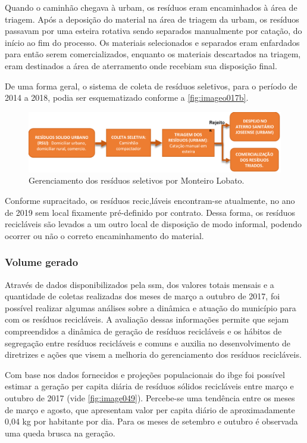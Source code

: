 	Quando o caminhão chegava à \gls{urbam}, os resíduos eram encaminhados à área de triagem. Após a deposição do material na área de triagem da \gls{urbam}, os resíduos passavam por uma esteira rotativa sendo separados manualmente por catação, do início ao fim do processo. Os materiais selecionados e separados eram enfardados para então serem comercializados, enquanto os materiais descartados na triagem, eram destinados a área de aterramento onde recebiam sua disposição final. 
	
	De uma forma geral, o sistema de coleta de resíduos seletivos, para o período de 2014 a 2018, podia ser esquematizado conforme a \autoref{fig:imageo017b}.
	
	\begin{figure}
	\centering
	\includegraphics[width=0.75\linewidth]{produtos/prodtres/image017b}
	\caption{Gerenciamento dos resíduos seletivos por Monteiro Lobato.}
	\label{fig:image017b}
	\end{figure}

	Conforme supracitado, os resíduos recic,láveis encontram-se atualmente, no ano de 2019 sem local fixamente pré-definido por contrato. Dessa forma, os resíduos recicláveis são levados a um outro local de disposição de modo informal, podendo ocorrer ou não o correto encaminhamento do material.
	
	\subsubsection{Volume gerado}
	
	Através de dados disponibilizados pela \gls{ssm}, dos valores totais mensais e a quantidade de coletas realizadas dos meses de março a outubro de 2017, foi possível realizar algumas análises sobre a dinâmica e atuação do município para com os resíduos recicláveis. A avaliação dessas informações permite que sejam compreendidos a dinâmica de geração de resíduos recicláveis e os hábitos de segregação entre resíduos recicláveis e comuns e auxilia no desenvolvimento de diretrizes e ações que visem a melhoria do gerenciamento dos resíduos recicláveis.
	
	Com base nos dados fornecidos e projeções populacionais do \gls{ibge} foi possível estimar a geração per capita diária de resíduos sólidos recicláveis entre março e outubro de 2017 (vide \autoref{fig:image049}). Percebe-se uma tendência entre os meses de março e agosto, que apresentam valor per capita diário de aproximadamente 0,04 kg por habitante por dia. Para os meses de setembro e outubro é observada uma queda brusca na geração.
	
